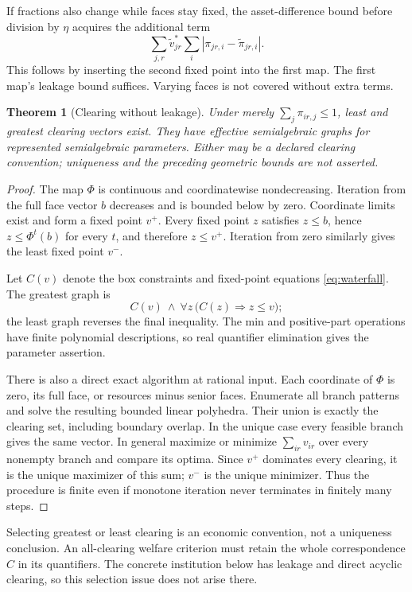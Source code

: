 \documentclass[11pt,a4paper]{article}
\numberwithin{equation}{section}
\newtheorem{theorem}{Theorem}[section]
\theoremstyle{definition}
\begin{document}
If fractions also change while faces stay fixed, the asset-difference
bound before division by \(\eta\) acquires the additional term
\[
\sum_{j,r}\widetilde v^*_{jr}
                  \sum_i|\pi_{jr,i}-\widetilde\pi_{jr,i}|.
\]
This follows by inserting the second fixed point into the first map.
The first map's leakage bound suffices. Varying faces is not covered
without extra terms.

\begin{theorem}[Clearing without leakage]\label{thm:extremeclearing}
Under merely \(\sum_j\pi_{ir,j}\le1\), least and greatest clearing vectors
exist. They have effective semialgebraic graphs for represented
semialgebraic parameters. Either may be a declared clearing convention;
uniqueness and the preceding geometric bounds are not asserted.
\end{theorem}
\begin{proof}
The map \(\Phi\) is continuous and coordinatewise nondecreasing. Iteration
from the full face vector \(b\) decreases and is bounded below by zero.
Coordinate limits exist and form a fixed point \(v^+\). Every fixed point
\(z\) satisfies \(z\le b\), hence \(z\le\Phi^t(b)\) for every \(t\), and
therefore \(z\le v^+\). Iteration from zero similarly gives the least
fixed point \(v^-\).

Let \(C(v)\) denote the box constraints and fixed-point equations
\eqref{eq:waterfall}. The greatest graph is
\[
 C(v)\ \wedge\ \forall z\,\bigl(C(z)\Longrightarrow z\le v\bigr);
\]
the least graph reverses the final inequality. The min and positive-part
operations have finite polynomial descriptions, so real quantifier
elimination gives the parameter assertion.

There is also a direct exact algorithm at rational input. Each coordinate
of \(\Phi\) is zero, its full face, or resources minus senior faces.
Enumerate all branch patterns and solve the resulting bounded linear
polyhedra. Their union is exactly the clearing set, including boundary
overlap. In the unique case every feasible branch gives the same vector.
In general maximize or minimize \(\sum_{ir}v_{ir}\) over every nonempty
branch and compare its optima. Since \(v^+\) dominates every clearing,
it is the unique maximizer of this sum; \(v^-\) is the unique minimizer.
Thus the procedure is finite even if monotone iteration never terminates
in finitely many steps.
\end{proof}

Selecting greatest or least clearing is an economic convention, not a
uniqueness conclusion. An all-clearing welfare criterion must retain the
whole correspondence \(C\) in its quantifiers. The concrete institution
below has leakage and direct acyclic clearing, so this selection issue
does not arise there.
\end{document}
